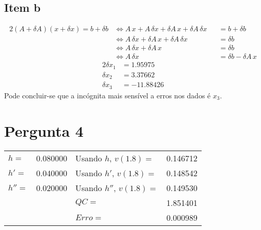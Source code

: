 {\subsection{Item b}
\begin{alignat*}{2}
	(A+\delta A)(x+\delta x)=b+\delta b
	&\iff A\,x+A\,\delta x+\delta A\, x + \delta A\, \delta x &&= b+\delta b\\
	&\iff A\,\delta x+\delta A\, x + \delta A\, \delta x &&= \delta b\\
	&\iff A\,\delta x+\delta A\, x &&= \delta b\\
	&\iff A\,\delta x &&= \delta b - \delta A\, x
\end{alignat*}
\begin{alignat*}{2}
	\delta x_1 &= 1.95975\\
	\delta x_2 &= 3.37662\\
	\delta x_3 &= -11.88426
\end{alignat*}
Pode concluir-se que a incógnita mais sensível a erros nos dados é $x_3$.
\section{Pergunta 4}
\begin{center} \begin{tabular}{l | c || l | c}
	$h  =$ & 0.080000 & Usando $h  $, $v(1.8)=$ & 0.146712 \\
	$h' =$ & 0.040000 & Usando $h' $, $v(1.8)=$ & 0.148542 \\
	$h''=$ & 0.020000 & Usando $h''$, $v(1.8)=$ & 0.149530 \\
           &          & $QC=$                   & 1.851401 \\
           &          & $Erro=$                 & 0.000989
\end{tabular} \end{center}
}
